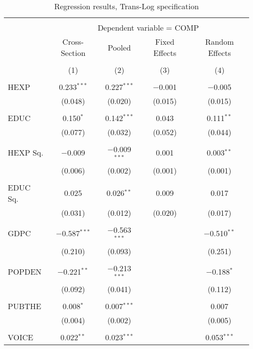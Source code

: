\documentclass[12pt,a4paper]{article}\usepackage[]{graphicx}\usepackage[]{color}
\begin{document}
\begin{table}[!htbp] \centering 
  \caption{Regression results, Trans-Log specification} 
  \label{tab:big} 
\scriptsize 
\begin{tabular}{@{\extracolsep{5pt}}lcccc} 
\\[-1.8ex]\hline 
\hline \\[-1.8ex] 
 & \multicolumn{4}{c}{Dependent variable = COMP} \\ 
\cline{2-5} 
 & Cross-Section & Pooled & Fixed Effects & Random Effects \\ 
\\[-1.8ex] & (1) & (2) & (3) & (4)\\ 
\hline \\[-1.8ex] 
 HEXP & 0.233$^{***}$ & 0.227$^{***}$ & $-$0.001 & $-$0.005 \\ 
  & (0.048) & (0.020) & (0.015) & (0.015) \\ 
  & & & & \\ 
 EDUC & 0.150$^{*}$ & 0.142$^{***}$ & 0.043 & 0.111$^{**}$ \\ 
  & (0.077) & (0.032) & (0.052) & (0.044) \\ 
  & & & & \\ 
 HEXP Sq. & $-$0.009 & $-$0.009$^{***}$ & 0.001 & 0.003$^{**}$ \\ 
  & (0.006) & (0.002) & (0.001) & (0.001) \\ 
  & & & & \\ 
 EDUC Sq. & 0.025 & 0.026$^{**}$ & 0.009 & 0.017 \\ 
  & (0.031) & (0.012) & (0.020) & (0.017) \\ 
  & & & & \\ 
 GDPC & $-$0.587$^{***}$ & $-$0.563$^{***}$ &  & $-$0.510$^{**}$ \\ 
  & (0.210) & (0.093) &  & (0.251) \\ 
  & & & & \\ 
 POPDEN & $-$0.221$^{**}$ & $-$0.213$^{***}$ &  & $-$0.188$^{*}$ \\ 
  & (0.092) & (0.041) &  & (0.112) \\ 
  & & & & \\ 
 PUBTHE & 0.008$^{*}$ & 0.007$^{***}$ &  & 0.007 \\ 
  & (0.004) & (0.002) &  & (0.005) \\ 
  & & & & \\ 
 VOICE & 0.022$^{**}$ & 0.023$^{***}$ &  & 0.053$^{***}$ \\ 

\end{tabular}
\end{table}
\end{document}
